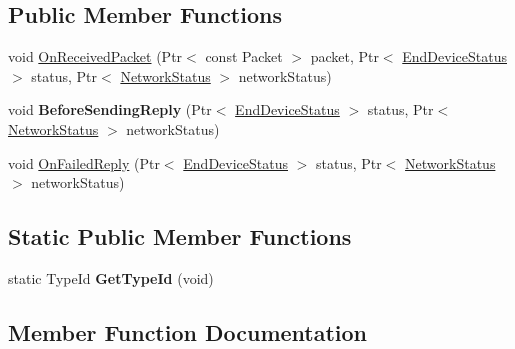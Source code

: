 \subsection*{Public Member Functions}
\begin{DoxyCompactItemize}
\item 
void \hyperlink{classns3_1_1lorawan_1_1ConfirmedMessagesComponent_a0e58f518722ae87373d6a33e7523e8b1}{On\+Received\+Packet} (Ptr$<$ const Packet $>$ packet, Ptr$<$ \hyperlink{classns3_1_1lorawan_1_1EndDeviceStatus}{End\+Device\+Status} $>$ status, Ptr$<$ \hyperlink{classns3_1_1lorawan_1_1NetworkStatus}{Network\+Status} $>$ network\+Status)
\item 
\mbox{\label{classns3_1_1lorawan_1_1ConfirmedMessagesComponent_a49e51698752d21f29d26ea1f8d01ecbf}} 
void {\bfseries Before\+Sending\+Reply} (Ptr$<$ \hyperlink{classns3_1_1lorawan_1_1EndDeviceStatus}{End\+Device\+Status} $>$ status, Ptr$<$ \hyperlink{classns3_1_1lorawan_1_1NetworkStatus}{Network\+Status} $>$ network\+Status)
\item 
void \hyperlink{classns3_1_1lorawan_1_1ConfirmedMessagesComponent_ae048f3d5aff4da319d113c213701ef73}{On\+Failed\+Reply} (Ptr$<$ \hyperlink{classns3_1_1lorawan_1_1EndDeviceStatus}{End\+Device\+Status} $>$ status, Ptr$<$ \hyperlink{classns3_1_1lorawan_1_1NetworkStatus}{Network\+Status} $>$ network\+Status)
\end{DoxyCompactItemize}
\subsection*{Static Public Member Functions}
\begin{DoxyCompactItemize}
\item 
\mbox{\label{classns3_1_1lorawan_1_1ConfirmedMessagesComponent_aceef26b9e73d26f22262101e0caf0476}} 
static Type\+Id {\bfseries Get\+Type\+Id} (void)
\end{DoxyCompactItemize}


\subsection{Member Function Documentation}
\mbox{\label{classns3_1_1lorawan_1_1ConfirmedMessagesComponent_ae048f3d5aff4da319d113c213701ef73}} 
